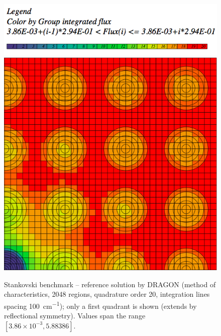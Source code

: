 \begin{figure}[!ht]
\centering
  \includegraphics[scale=.4]{stankov/DRAGONl}\\
  \includegraphics[scale=.4]{stankov/DRAGON}
  \caption[Stankovski benchmark -- reference solution by DRAGON]{Stankovski benchmark -- reference solution by DRAGON
  (method of characteristics, 2048 regions, quadrature order 20, integration lines spacing \SI{100}{cm^{-1}}); only a
  first quadrant is shown (extends by reflectional symmetry). Values span the range $[3.86\times 10^{-3},
  5.88386]$.}
  \label{fig:39}
\end{figure}

